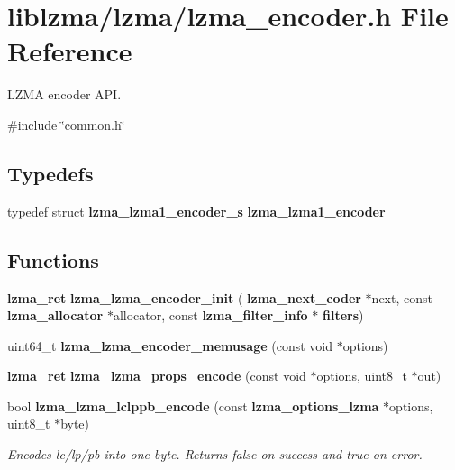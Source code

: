 \section{liblzma/lzma/lzma\+\_\+encoder.h File Reference}
\label{lzma__encoder_8h}


L\+Z\+MA encoder A\+PI.  


{\ttfamily \#include \char`\"{}common.\+h\char`\"{}}\newline
\subsection*{Typedefs}
\begin{DoxyCompactItemize}
\item 
\mbox{\label{lzma__encoder_8h_aa4fa7528675cb757121b65b949889b1a}} 
typedef struct \textbf{ lzma\+\_\+lzma1\+\_\+encoder\+\_\+s} {\bfseries lzma\+\_\+lzma1\+\_\+encoder}
\end{DoxyCompactItemize}
\subsection*{Functions}
\begin{DoxyCompactItemize}
\item 
\mbox{\label{lzma__encoder_8h_a077433cf89be07232e26627ff8e10831}} 
\textbf{ lzma\+\_\+ret} {\bfseries lzma\+\_\+lzma\+\_\+encoder\+\_\+init} (\textbf{ lzma\+\_\+next\+\_\+coder} $\ast$next, const \textbf{ lzma\+\_\+allocator} $\ast$allocator, const \textbf{ lzma\+\_\+filter\+\_\+info} $\ast$\textbf{ filters})
\item 
\mbox{\label{lzma__encoder_8h_a69751f4a64caf8d24a2f94b0301e04c2}} 
uint64\+\_\+t {\bfseries lzma\+\_\+lzma\+\_\+encoder\+\_\+memusage} (const void $\ast$options)
\item 
\mbox{\label{lzma__encoder_8h_a5f00e852ffad77bfde90803a36752c24}} 
\textbf{ lzma\+\_\+ret} {\bfseries lzma\+\_\+lzma\+\_\+props\+\_\+encode} (const void $\ast$options, uint8\+\_\+t $\ast$out)
\item 
bool \textbf{ lzma\+\_\+lzma\+\_\+lclppb\+\_\+encode} (const \textbf{ lzma\+\_\+options\+\_\+lzma} $\ast$options, uint8\+\_\+t $\ast$byte)
\begin{DoxyCompactList}\small\item\em Encodes lc/lp/pb into one byte. Returns false on success and true on error. \end{DoxyCompactList}\end{DoxyCompactItemize}


